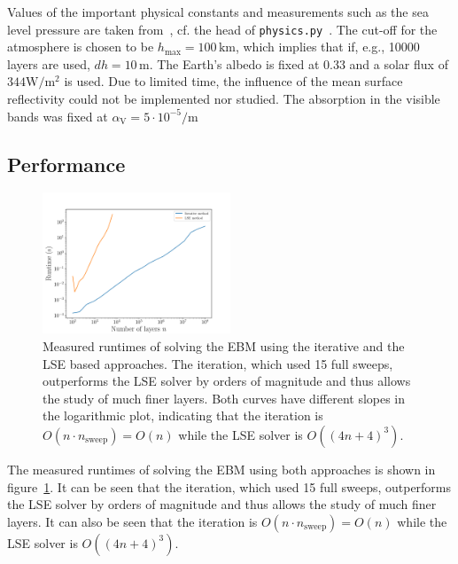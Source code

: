 \documentclass[a4paper,DIV=12,english]{scrartcl}
\begin{document}
Values of the important physical constants and measurements such as the sea level pressure are taken from~\cite{Wolfram}, cf. the head of \texttt{physics.py}~\cite{github}. The cut-off for the atmosphere is chosen to be $h_\text{max}=100\,\text{km}$, which implies that if, e.g., 10000 layers are used, $dh=10\,\text{m}$. The Earth's albedo is fixed at 0.33 and a solar flux of $344 \text{W}/\text{m}^2$ is used. Due to limited time, the influence of the mean surface reflectivity could not be implemented nor studied. The absorption in the visible bands was fixed at $\alpha_\text{V}=5\cdot 10^{-5}/\text{m}$
\subsection{Performance}
\begin{figure}
    \centering
    \includegraphics[width=0.5\textwidth]{../plots/performance.pdf}
    \caption{Measured runtimes of solving the EBM using the iterative and the LSE based approaches. The iteration, which used 15 full sweeps, outperforms the LSE solver by orders of magnitude and thus allows the study of much finer layers. Both curves have different slopes in the logarithmic plot, indicating that the iteration is $O(n\cdot n_\text{sweep})=O(n)$ while the LSE solver is $O\left((4n+4)^3\right)$.}
    \label{fig:performance}
\end{figure}
The measured runtimes of solving the EBM using both approaches is shown in figure~\ref{fig:performance}. It can be seen that the iteration, which used 15 full sweeps, outperforms the LSE solver by orders of magnitude and thus allows the study of much finer layers. It can also be seen that the iteration is $O(n\cdot n_\text{sweep})=O(n)$ while the LSE solver is $O\left((4n+4)^3\right)$.
\end{document}
